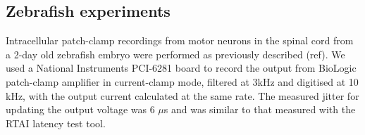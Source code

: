 \subsection*{Zebrafish experiments}

Intracellular patch-clamp recordings from motor neurons in the spinal
cord from a 2-day old zebrafish embryo were performed as previously
described (ref). We used a National Instruments PCI-6281 board to
record the output from BioLogic patch-clamp amplifier in current-clamp
mode, filtered at 3kHz and digitised at 10 kHz, with the output
current calculated at the same rate. The measured jitter for updating
the output voltage was 6 $\mu$s and was similar to that measured
with the RTAI latency test tool.  




